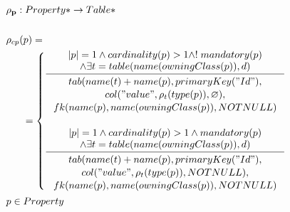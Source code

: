 \documentclass[11pt]{article}
\begin{document}
\begin{align*}
&	\mathbf{\rho_p} : Property* \rightarrow Table* \\ \\
&	\rho_{cp}(p) = \\
& \;\;\;\;\;\; =\begin{cases}
     	\inference{|p| = 1 \wedge cardinality(p) > 1 \wedge !\;mandatory(p) \\ 
     		\wedge 	\exists t = table(name(owningClass(p)), d)
     		}{\begin{gathered}
     			tab(name(t)+name(p), primaryKey("Id"), \\ col("value", \rho_t(type(p)), \varnothing), \\ fk(name(p), 			name(owningClass(p)), NOTNULL) \\
    	\end{gathered}}\\ \\
     	\inference{|p| = 1 \wedge  cardinality(p) > 1 \wedge mandatory(p) \\ 
     		\wedge \exists t = table(name(owningClass(p)), d) 
     		}{\begin{gathered}  
     			tab(name(t)+name(p), primaryKey("Id"), \\ 
     			col("value", \rho_t(type(p)), NOTNULL), \\ 			fk(name(p), name(owningClass(p)), NOTNULL)
    	 \end{gathered}}
 	\end{cases}\\
& 	p \in Property
\end{align*}
\end{document}
